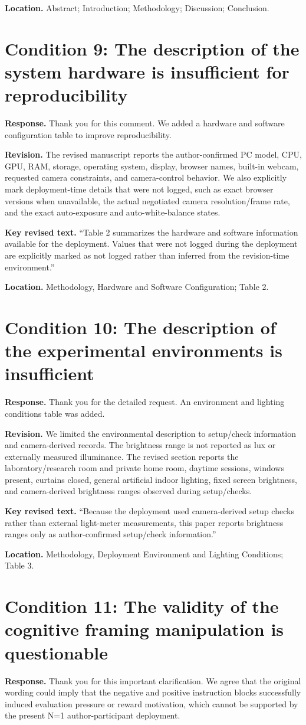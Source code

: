 \documentclass[11pt]{article}
\newcommand{\condition}[2]{\section*{Condition #1: #2}}
\begin{document}
\textbf{Location.}
Abstract; Introduction; Methodology; Discussion; Conclusion.

\condition{9}{The description of the system hardware is insufficient for reproducibility}
\textbf{Response.}
Thank you for this comment.
We added a hardware and software configuration table to improve reproducibility.

\textbf{Revision.}
The revised manuscript reports the author-confirmed PC model, CPU, GPU, RAM, storage, operating system, display, browser names, built-in webcam, requested camera constraints, and camera-control behavior.
We also explicitly mark deployment-time details that were not logged, such as exact browser versions when unavailable, the actual negotiated camera resolution/frame rate, and the exact auto-exposure and auto-white-balance states.

\textbf{Key revised text.}
``Table 2 summarizes the hardware and software information available for the deployment.
Values that were not logged during the deployment are explicitly marked as not logged rather than inferred from the revision-time environment.''

\textbf{Location.}
Methodology, Hardware and Software Configuration; Table 2.

\condition{10}{The description of the experimental environments is insufficient}
\textbf{Response.}
Thank you for the detailed request.
An environment and lighting conditions table was added.

\textbf{Revision.}
We limited the environmental description to setup/check information and camera-derived records.
The brightness range is not reported as lux or externally measured illuminance.
The revised section reports the laboratory/research room and private home room, daytime sessions, windows present, curtains closed, general artificial indoor lighting, fixed screen brightness, and camera-derived brightness ranges observed during setup/checks.

\textbf{Key revised text.}
``Because the deployment used camera-derived setup checks rather than external light-meter measurements, this paper reports brightness ranges only as author-confirmed setup/check information.''

\textbf{Location.}
Methodology, Deployment Environment and Lighting Conditions; Table 3.

\condition{11}{The validity of the cognitive framing manipulation is questionable}
\textbf{Response.}
Thank you for this important clarification.
We agree that the original wording could imply that the negative and positive instruction blocks successfully induced evaluation pressure or reward motivation, which cannot be supported by the present N=1 author-participant deployment.
\end{document}

